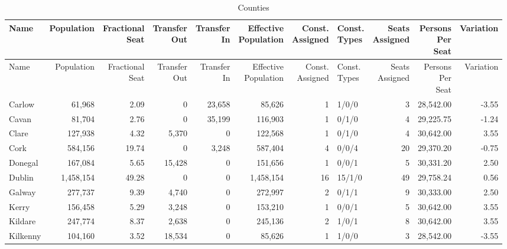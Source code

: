 \documentclass[a4paper]{article}
\begin{document}
\begin{longtable}{lrrrrrrlrrr}
\caption{Counties}
\\ \toprule
Name &Population &\shortstack{Fractional\\Seat} &\shortstack{Transfer\\Out} &\shortstack{Transfer\\In} &\shortstack{Effective\\Population} &\shortstack{Const.\\Assigned} &\shortstack{Const.\\Types} &\shortstack{Seats\\Assigned} &\shortstack{Persons\\Per\\Seat} &Variation \\ \midrule
\endfirsthead
\toprule
Name &Population &\shortstack{Fractional\\Seat} &\shortstack{Transfer\\Out} &\shortstack{Transfer\\In} &\shortstack{Effective\\Population} &\shortstack{Const.\\Assigned} &\shortstack{Const.\\Types} &\shortstack{Seats\\Assigned} &\shortstack{Persons\\Per\\Seat} &Variation \\ \midrule
\endhead
\bottomrule
\endfoot
Carlow&61,968& 2.09&0&23,658&85,626&1&1/0/0&3&28,542.00&-3.55\\ 
Cavan&81,704& 2.76&0&35,199&116,903&1&0/1/0&4&29,225.75&-1.24\\ 
Clare&127,938& 4.32&5,370&0&122,568&1&0/1/0&4&30,642.00& 3.55\\ 
Cork&584,156&19.74&0&3,248&587,404&4&0/0/4&20&29,370.20&-0.75\\ 
Donegal&167,084& 5.65&15,428&0&151,656&1&0/0/1&5&30,331.20& 2.50\\ 
Dublin&1,458,154&49.28&0&0&1,458,154&16&15/1/0&49&29,758.24& 0.56\\ 
Galway&277,737& 9.39&4,740&0&272,997&2&0/1/1&9&30,333.00& 2.50\\ 
Kerry&156,458& 5.29&3,248&0&153,210&1&0/0/1&5&30,642.00& 3.55\\ 
Kildare&247,774& 8.37&2,638&0&245,136&2&1/0/1&8&30,642.00& 3.55\\ 
Kilkenny&104,160& 3.52&18,534&0&85,626&1&1/0/0&3&28,542.00&-3.55\\ 

\end{longtable}
\end{document}
